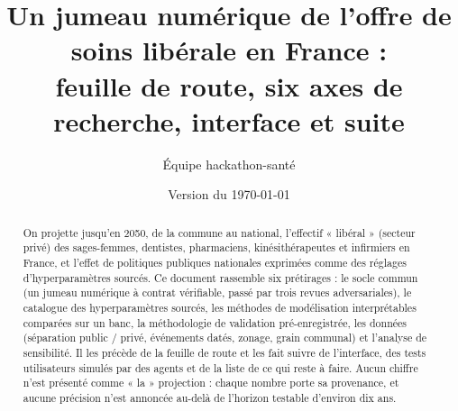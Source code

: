 \documentclass[11pt]{article}
\title{Un jumeau numérique de l'offre de soins libérale en France :\\
feuille de route, six axes de recherche, interface et suite}
\author[1]{Équipe hackathon-santé}
\affil[1]{Projet « jumeau numérique de l'offre de soins », dépôt \texttt{hackathon-sante/v2}}
\date{Version du \today}
\begin{document}
\maketitle

\begin{abstract}
On projette jusqu'en 2050, de la commune au national, l'effectif « libéral » (secteur privé) des
sages-femmes, dentistes, pharmaciens, kinésithérapeutes et infirmiers en France, et l'effet de
politiques publiques nationales exprimées comme des réglages d'hyperparamètres sourcés. Ce
document rassemble six prétirages :
le socle commun (un jumeau numérique à contrat vérifiable, passé par trois revues
adversariales), le catalogue des hyperparamètres sourcés, les méthodes de modélisation
interprétables comparées sur un banc, la méthodologie de validation pré-enregistrée, les données
(séparation public / privé, événements datés, zonage, grain communal) et l'analyse de
sensibilité. Il les précède de la feuille de route et les fait suivre de l'interface, des tests
utilisateurs simulés par des agents et de la liste de ce qui reste à faire. Aucun chiffre n'est
présenté comme « la » projection : chaque nombre porte sa provenance, et aucune précision n'est
annoncée au-delà de l'horizon testable d'environ dix ans.
\end{abstract}

\tableofcontents
\clearpage






\clearpage



\appendix

\end{document}
